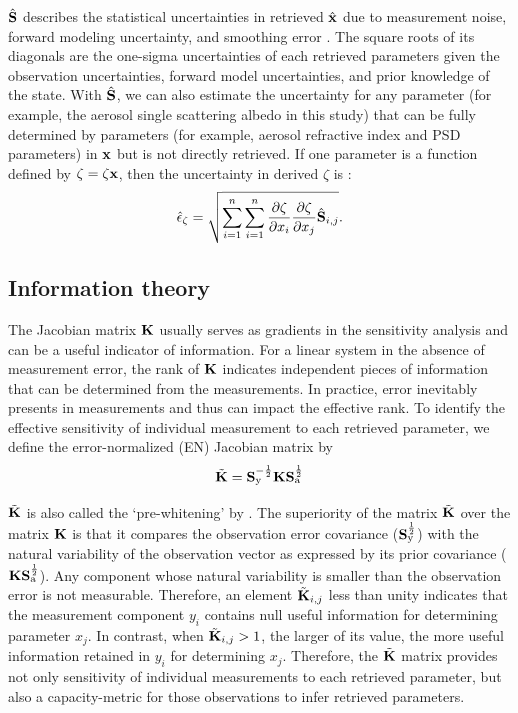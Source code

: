 $\hat{\mathbf{S}}$ describes the statistical uncertainties in retrieved
$\hat{\mathbf{x}}$ due to measurement noise, forward modeling uncertainty, 
and smoothing error \citep{Rodgers00}. The square roots of its 
diagonals are the one-sigma uncertainties of each retrieved parameters 
given the observation uncertainties, forward model uncertainties, 
and prior knowledge of the state. With $\hat{\mathbf{S}}$, we can also 
estimate the uncertainty for any parameter (for example, the aerosol single 
scattering albedo in this study) that can be fully
determined by parameters (for example, aerosol refractive index and PSD
parameters) in $\mathbf{x}$ but is not directly retrieved. If one
parameter is a function defined by $\zeta=\zeta{\mathbf{x}}$, then the 
uncertainty in derived $\zeta$ is \citep{Rodgers00}:
\begin{equation}
\hat{\epsilon}_\zeta =
\sqrt{\sum_{i=1}^n\sum_{i=1}^n
      \frac{\partial\zeta}{\partial{x_i}} 
      \frac{\partial\zeta}{\partial{x_j}}
      \hat{\mathbf{S}}_{i,j}
      }.\label{eq:zeta}
\end{equation}

\subsection{Information theory} \label{subsec:infotheory}

The Jacobian matrix $\mathbf{K}$ usually serves as gradients in the sensitivity
analysis and can be a useful indicator of information. For a linear
system in the absence of measurement error, the rank of $\mathbf{K}$ indicates
independent pieces of information that can be determined from the
measurements. In practice, error inevitably presents in measurements and
thus can impact the effective rank. To identify the effective
sensitivity of individual measurement to each retrieved parameter, we
define the error-normalized (EN) Jacobian matrix by
\begin{equation}
\tilde{\mathbf{K}} = \mathbf{S}_\text{y}^{-\frac{1}{2}}\mathbf{K}\mathbf{S}_\text{a}^{\frac{1}{2}}
\label{eq:enj}
\end{equation}

$\tilde{\mathbf{K}}$ is also called the ‘pre-whitening’ by \cite{Rodgers00}. 
The superiority of the matrix $\tilde{\mathbf{K}}$ over the matrix $\mathbf{K}$ is 
that it compares the observation error covariance
($\mathbf{S}_\text{y}^{\frac{1}{2}}$) with the natural variability of the
observation vector as expressed by its prior covariance
($\mathbf{K}\mathbf{S}_\text{a}^{\frac{1}{2}}$).
Any component whose natural variability is smaller than the observation
error is not measurable. Therefore, an element $\tilde{\mathbf{K}}_{i,j}$ less than
unity indicates that the measurement component $y_i$ contains null useful
information for determining parameter $x_j$. In contrast, when
$\tilde{\mathbf{K}}_{i,j}>1$, the larger of its value, the more useful
information retained in $y_i$ for determining $x_j$. Therefore, the
$\tilde{\mathbf{K}}$ matrix provides not only sensitivity of individual 
measurements to each retrieved parameter, but also a capacity-metric 
for those observations to infer retrieved parameters. 

